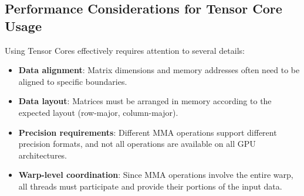 \subsection{Performance Considerations for Tensor Core Usage}

Using Tensor Cores effectively requires attention to several details:

\begin{itemize}
    \item \textbf{Data alignment}: Matrix dimensions and memory addresses often need to be aligned to specific boundaries.
    
    \item \textbf{Data layout}: Matrices must be arranged in memory according to the expected layout (row-major, column-major).
    
    \item \textbf{Precision requirements}: Different MMA operations support different precision formats, and not all operations are available on all GPU architectures.
    
    \item \textbf{Warp-level coordination}: Since MMA operations involve the entire warp, all threads must participate and provide their portions of the input data.
\end{itemize}


